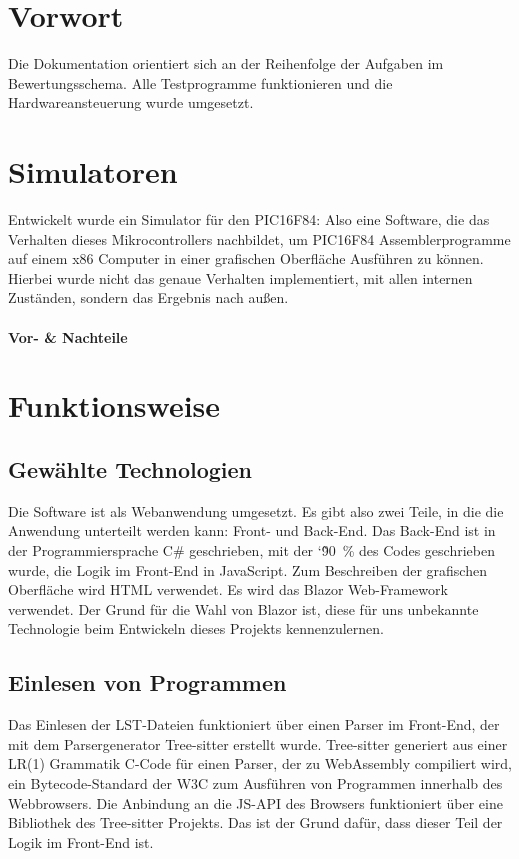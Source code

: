 \section{Vorwort}
Die Dokumentation orientiert sich an der Reihenfolge der Aufgaben im Bewertungsschema.
Alle Testprogramme funktionieren und die Hardwareansteuerung wurde umgesetzt.



\section{Simulatoren}
Entwickelt wurde ein Simulator für den PIC16F84:
Also eine Software, die das Verhalten dieses Mikrocontrollers nachbildet,
um PIC16F84 Assemblerprogramme auf einem x86 Computer in einer grafischen Oberfläche Ausführen zu können.
Hierbei wurde nicht das genaue Verhalten implementiert, mit allen internen Zuständen,
sondern das Ergebnis nach außen.

\paragraph{Vor- \& Nachteile}



\section{Funktionsweise}

\subsection{Gewählte Technologien}
Die Software ist als Webanwendung umgesetzt.
Es gibt also zwei Teile, in die die Anwendung unterteilt werden kann:
Front- und Back-End.
Das Back-End ist in der Programmiersprache C\# geschrieben, mit der \char`\~90~\% des Codes geschrieben wurde,
die Logik im Front-End in JavaScript.
Zum Beschreiben der grafischen Oberfläche wird HTML verwendet.
Es wird das Blazor Web-Framework verwendet.
Der Grund für die Wahl von Blazor ist,
diese für uns unbekannte Technologie beim Entwickeln dieses Projekts kennenzulernen. 


\subsection{Einlesen von Programmen}
Das Einlesen der LST-Dateien funktioniert über einen Parser im Front-End,
der mit dem Parsergenerator Tree-sitter erstellt wurde.
Tree-sitter generiert aus einer LR(1) Grammatik C-Code für einen Parser,
der zu WebAssembly compiliert wird, ein Bytecode-Standard der W3C zum Ausführen von Programmen innerhalb des Webbrowsers.
Die Anbindung an die JS-API des Browsers funktioniert über eine 
Bibliothek des Tree-sitter Projekts.
Das ist der Grund dafür, dass dieser Teil der Logik im Front-End ist.

